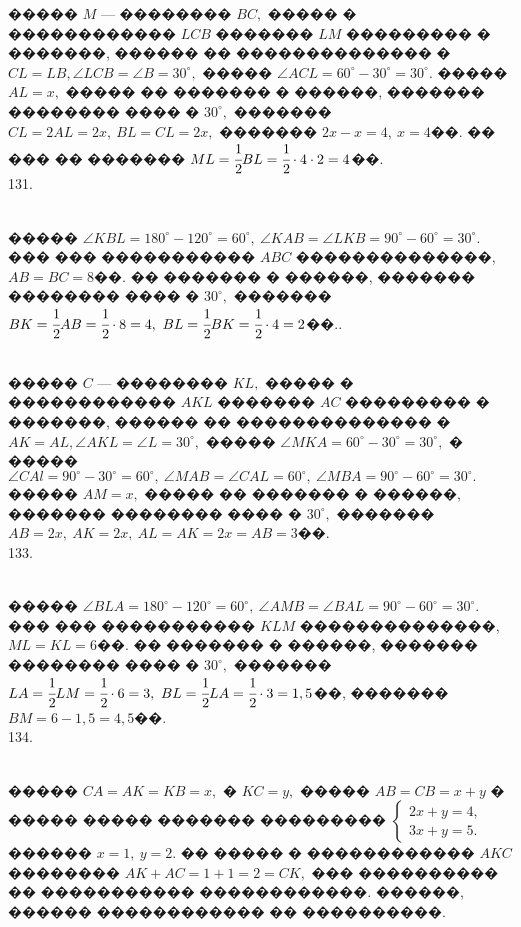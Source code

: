 \documentclass[12pt]{article}
\begin{document}
����� $M$ --- �������� $BC,$ ����� � ������������ $LCB$ ������� $LM$ ��������� � �������, ������ �� �������������� �  $CL=LB, \angle LCB=\angle B=30^\circ,$ ����� $\angle ACL=60^\circ-30^\circ=30^\circ.$ ����� $AL=x,$ ����� �� ������� � ������, ������� �������� ���� � $30^\circ,$ ������� $CL=2AL=2x,\ BL=CL=2x,$ ������� $2x-x=4,\ x=4$��. �� ��� �� ������� $ML=\cfrac{1}{2}BL=\cfrac{1}{2}\cdot4\cdot2=4$��.\\
131. \begin{figure}[ht!]
\end{figure}\\
����� $\angle KBL=180^\circ-120^\circ=60^\circ,\ \angle KAB=\angle LKB=90^\circ-60^\circ=30^\circ.$ ��� ��� ����������� $ABC$ ��������������, $AB=BC=8$��. �� ������� � ������, ������� �������� ���� � $30^\circ,$ ������� $BK=\cfrac{1}{2}AB=\cfrac{1}{2}\cdot8=4,\ BL=\cfrac{1}{2}BK=\cfrac{1}{2}\cdot4=2$��.\newpage{}. \begin{figure}[ht!]
\end{figure}\\
����� $C$ --- �������� $KL,$ ����� � ������������ $AKL$ ������� $AC$ ��������� � �������, ������ �� �������������� �  $AK=AL, \angle AKL=\angle L=30^\circ,$ ����� $\angle MKA=60^\circ-30^\circ=30^\circ,$ � ����� $\angle CAl=90^\circ-30^\circ=60^\circ,\ \angle MAB=\angle CAL=60^\circ,\ \angle MBA=90^\circ-60^\circ=30^\circ.$
����� $AM=x,$ ����� �� ������� � ������, ������� �������� ���� � $30^\circ,$ ������� $AB=2x,\ AK=2x,\ AL=AK=2x=AB=3$��.\\
133. \begin{figure}[ht!]
\end{figure}\\
����� $\angle BLA=180^\circ-120^\circ=60^\circ,\ \angle AMB=\angle BAL=90^\circ-60^\circ=30^\circ.$ ��� ��� ����������� $KLM$ ��������������, $ML=KL=6$��. �� ������� � ������, ������� �������� ���� � $30^\circ,$ ������� $LA=\cfrac{1}{2}LM=\cfrac{1}{2}\cdot6=3,\ BL=\cfrac{1}{2}LA=\cfrac{1}{2}\cdot3=1,5$��, ������� $BM=6-1,5=4,5$��.\\
134. \begin{figure}[ht!]
\end{figure}\\
����� $CA=AK=KB=x,$ � $KC=y,$ ����� $AB=CB=x+y$ � ����� ����� ������� ��������� $\begin{cases} 2x+y=4,\\ 3x+y=5.\end{cases}$ ������ $x=1,\ y=2.$ �� ����� � ������������ $AKC$ �������� $AK+AC=1+1=2=CK,$ ��� ���������� �� ����������� ������������. ������, ������ ������������ �� ����������.\newpage\noindent
\end{document}
